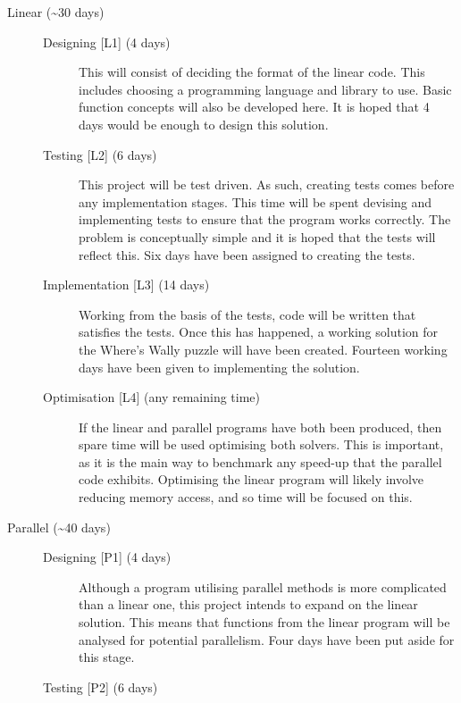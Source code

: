 \documentclass[main.tex]{subfiles}
\begin{document}
    \begin{description}
      \item[Linear (\textasciitilde30 days)]\hfill
        \begin{description}
          \item[Designing {[L1]} (4 days)]
            This will consist of deciding the format of the linear code.
            This includes choosing a programming language and library to use.
            Basic function concepts will also be developed here.
            It is hoped that 4 days would be enough to design this solution.
          \item[Testing {[L2]} (6 days)]
            This project will be test driven.
            As such, creating tests comes before any implementation stages.
            This time will be spent devising and implementing tests to ensure that the program works correctly.
            The problem is conceptually simple and it is hoped that the tests will reflect this.
            Six days have been assigned to creating the tests.
          \item[Implementation {[L3]} (14 days)]
            Working from the basis of the tests, code will be written that satisfies the tests.
            Once this has happened, a working solution for the Where's Wally puzzle will have been created.
            Fourteen working days have been given to implementing the solution.
          \item[Optimisation {[L4]} (any remaining time)]
            If the linear and parallel programs have both been produced, then spare time will be used optimising both solvers.
            This is important, as it is the main way to benchmark any speed-up that the parallel code exhibits.
            Optimising the linear program will likely involve reducing memory access, and so time will be focused on this.
        \end{description}
      \item[Parallel (\textasciitilde40 days)]\hfill
        \begin{description}
          \item[Designing {[P1]} (4 days)]
            Although a program utilising parallel methods is more complicated than a linear one, this project intends to expand on the linear solution.
            This means that functions from the linear program will be analysed for potential parallelism.
            Four days have been put aside for this stage.
          \item[Testing {[P2]} (6 days)]

\end{description}
\end{description}
\end{document}
